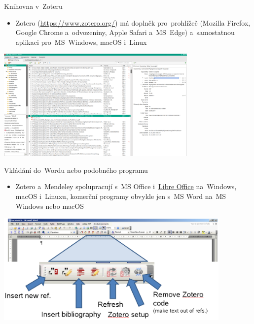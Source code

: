 \documentclass[compress, ucs, xelatex, 11pt, xcolor=svgnames, aspectratio=169,
	hyperref={
		bookmarks=true,
		unicode=true,
		colorlinks=true,
		pdftitle={Citacni software},
		plainpages=false,
		pdfauthor={Vojtech Zeisek},
		pdfsubject={Kratky uvod do citacniho software},
		pdfcreator={XeLaTeX},
		pdfkeywords={citace, reference, software, literatura},
		linkcolor=Crimson, %
		anchorcolor=Magenta, %
		citecolor=Magenta, %
		filecolor=Magenta, %
		menucolor=Magenta, %
		urlcolor=DarkTurquoise, %
		pdftex},
	url={hyphens, lowtilde} %
	]{beamer}
\begin{document}
\begin{frame}{Knihovna v~Zoteru}
	\begin{itemize}
		\item Zotero (\url{https://www.zotero.org/}) má doplněk pro~prohlížeč (Mozilla Firefox, Google Chrome a~odvozeniny, Apple Safari a~MS~Edge) a~samostatnou aplikaci pro~MS~Windows, macOS i~Linux
	\end{itemize}
	\begin{center}
		\includegraphics[height=5.5cm]{zotero.png}
	\end{center}
\end{frame}

\begin{frame}{Vkládání do~Wordu nebo podobného programu}
	\begin{itemize}
		\item Zotero a~Mendeley spolupracují s~MS Office i~\href{https://cs.libreoffice.org/}{Libre Office} na~Windows, macOS i~Linuxu, komerční programy obvykle jen s~MS Word na~MS Windows nebo macOS
	\end{itemize}
	\begin{center}
		\includegraphics[height=5.5cm]{zotero_lista.png}
	\end{center}
\end{frame}
\end{document}
